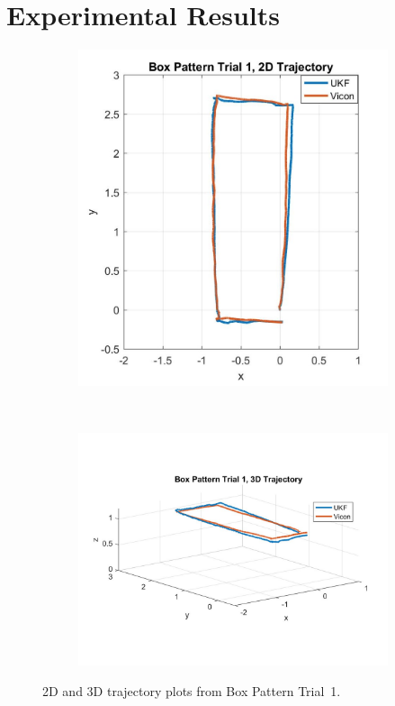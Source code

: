 \chapter{Experimental Results}

\begin{figure}
    \centering
    \begin{subfigure}{0.4\textwidth}
        \includegraphics[width=\textwidth,left]{box1_2d}
    \end{subfigure}%
    ~ 
    \begin{subfigure}{0.6\textwidth}
        \centering
        \includegraphics[width=\textwidth,right]{box1_3d}
    \end{subfigure}
    \caption[Box Pattern Trial 1 Trajectory]{2D and 3D trajectory plots from Box Pattern Trial~1.}
    \label{box1_traj}
\end{figure}

